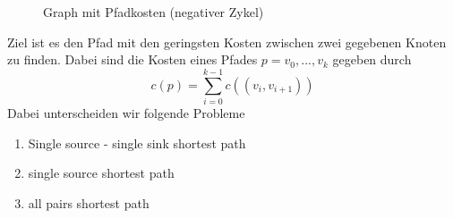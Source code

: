								\begin{figure}
									\centering
									
									\caption{Graph mit Pfadkosten (negativer Zykel)}
								\end{figure}
                Ziel ist es den Pfad mit den geringsten Kosten zwischen zwei gegebenen Knoten zu finden. Dabei sind die Kosten eines Pfades $p= v_0,...,v_k$  gegeben durch 
                $$
                    c(p) = \sum_{i=0}^{k-1}{c((v_i,v_{i+1}))}
                $$
                Dabei unterscheiden wir folgende Probleme
                \begin{enumerate}
                    \item Single source - single sink shortest path
                    \item single source shortest path
                    \item all pairs shortest path
                \end{enumerate}
                
